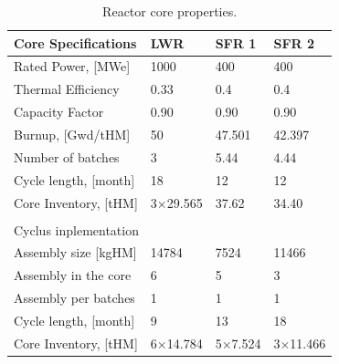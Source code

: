 \documentclass[12pt]{article}
\begin{document}
\begin{table}[h!]
    \centering
    \begin{tabularx}{350pt}{lXXX}
      \hline
      Core Specifications   &  LWR             &  SFR 1           &  SFR 2            \\
      \hline
      Rated Power, [MWe]    &  1000            &  400             &  400              \\
      Thermal Efficiency    &  0.33            &  0.4             &  0.4              \\
      Capacity Factor       &  0.90            &  0.90            &  0.90             \\
      Burnup, [Gwd/tHM]     &  50              &  47.501          &  42.397           \\
      Number of batches     &  3               &  5.44            &  4.44             \\
      Cycle length, [month] &  18              &  12              &  12               \\
      Core Inventory, [tHM] &  3$\times$29.565 &  37.62           &  34.40            \\
                                                                                      \\
      \multicolumn{4}{l}{Cyclus inplementation}                                       \\ 
      \hline
      \hline
      Assembly size [kgHM]  &  14784           &  7524            &  11466            \\
      Assembly in the core  &  6               &  5               &  3                \\
      Assembly per batches  &  1               &  1               &  1                \\
      Cycle length, [month] &  9               &  13              &  18               \\
      Core Inventory, [tHM] &  6$\times$14.784 &  5$\times$7.524  &  3$\times$11.466  \\
      \hline
    \end{tabularx}
    \caption{Reactor core properties.}
    \label{tab:reactor}
\end{table}
\end{document}
